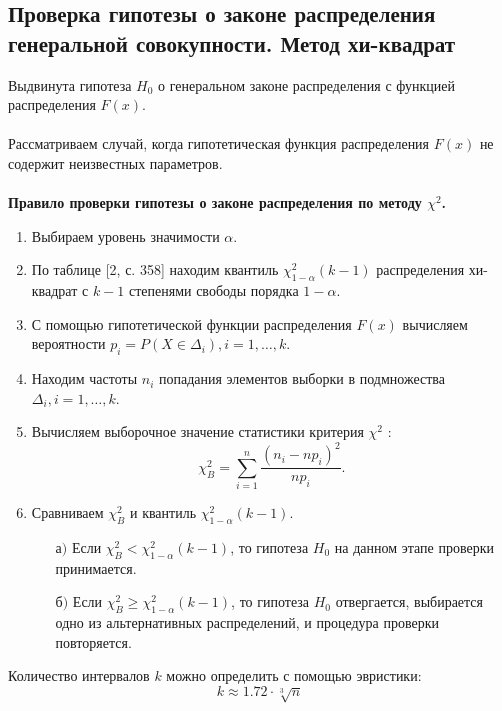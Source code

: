\documentclass[12pt]{article}
\begin{document}
\subsection{Проверка гипотезы о законе распределения генеральной совокупности. Метод хи-квадрат}
Выдвинута гипотеза $H_0$ о генеральном законе распределения с функцией
распределения $F(x)$.\\
\phantom{0}\\
Рассматриваем случай, когда гипотетическая функция распределения $F(x)$
не содержит неизвестных параметров.\\
\phantom{0}\\
\textbf{Правило проверки гипотезы о законе распределения по методу $\chi^2$.}
\begin{enumerate}
    \item Выбираем уровень значимости $\alpha$.

    \item По таблице [2, с. 358] находим квантиль $\chi^2_{1-\alpha}(k-1)$ распределения хи-квадрат с $k-1$ степенями свободы порядка $1-\alpha$.

    \item С помощью гипотетической функции распределения $F(x)$ вычисляем
    вероятности $p_i = P(X\in \Delta_i), i=1,\dots,k$.

    \item Находим частоты $n_i$ попадания элементов выборки в подмножества
    $\Delta_i, i = 1,\dots,k$.

    \item Вычисляем выборочное значение статистики критерия $\chi^2$ :
    \[
        \chi^2_B = \sum_{i=1}^{n}\frac{(n_i - np_i)^2}{np_i}.    
    \]

    \item Сравниваем $\chi^2_B$ и квантиль  $\chi^2_{1-\alpha}(k-1)$.
    \begin{itemize}
        \item[$\text{а)}$] Если $\chi^2_B < \chi^2_{1-\alpha}(k-1)$, то гипотеза $H_0$ на данном этапе проверки принимается.
        \item[$\text{б)}$] Если $\chi^2_B \geq \chi^2_{1-\alpha}(k-1)$, то гипотеза $H_0$ отвергается, выбирается одно из альтернативных распределений, и процедура проверки повторяется.
    \end{itemize}
\end{enumerate}
Количество интервалов $k$ можно определить с помощью эвристики:
\begin{equation}
    k \approx 1.72\cdot\sqrt[3]{n}
    \label{k}
\end{equation}
\end{document}
